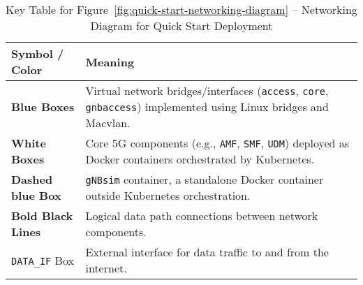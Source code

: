 \begin{table}[H]
\centering
\caption*{Key Table for Figure~\ref{fig:quick-start-networking-diagram} – Networking Diagram for Quick Start Deployment}
\renewcommand{\arraystretch}{1.3}
\begin{tabular}{@{}p{4cm}>{\raggedright\arraybackslash}p{10cm}@{}}
\toprule
\textbf{Symbol / Color} & \textbf{Meaning} \\
\midrule
{\textbf{Blue Boxes}} & Virtual network bridges/interfaces (\texttt{access}, \texttt{core}, \texttt{gnbaccess}) implemented using Linux bridges and Macvlan. \\
\textbf{White Boxes} & Core 5G components (e.g., \texttt{AMF}, \texttt{SMF}, \texttt{UDM}) deployed as Docker containers orchestrated by Kubernetes. \\
{\textbf{Dashed blue Box}} & \texttt{gNBsim} container, a standalone Docker container outside Kubernetes orchestration. \\
\textbf{Bold Black Lines} & Logical data path connections between network components. \\
\texttt{DATA\_IF} Box & External interface for data traffic to and from the internet. \\
\bottomrule
\end{tabular}
\end{table}

